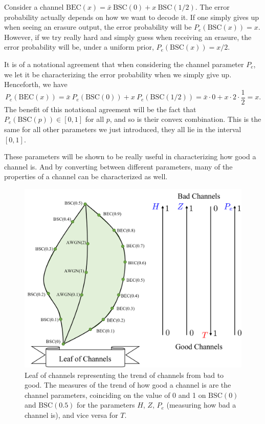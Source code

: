 \begin{example}
    Consider a channel $\mathrm{BEC}(x) = \bar{x}~\mathrm{BSC}(0) + x~\mathrm{BSC}(1/2)$. The error probability actually depends on how we want to decode it. If one simply gives up when seeing an erasure output, the error probability will be $P_e(\mathrm{BSC}(x))=x$. However, if we try really hard and simply guess when receiving an erasure, the error probability will be, under a uniform prior, $P_e(\mathrm{BSC}(x))=x/2$.

    It is of a notational agreement that when considering the channel parameter $P_e$, we let it be characterizing the error probability when we simply give up. Henceforth, we have
    \begin{equation*}
        P_e\left(\mathrm{BEC}(x)\right) = \bar{x}~P_e\left(\mathrm{BSC}(0)\right) + x~P_e\left(\mathrm{BSC}(1/2)\right) = \bar{x}\cdot0 + x\cdot2\cdot\frac{1}{2} = x.
    \end{equation*}
    The benefit of this notational agreement will be the fact that $P_e\left(\mathrm{BSC}(p)\right)\in[0,1]$ for all $p$, and so is their convex combination. This is the same for all other parameters we just introduced, they all lie in the interval $[0,1]$.
\end{example}
These parameters will be shown to be really useful in characterizing how good a channel is. And by converting between different parameters, many of the properties of a channel can be characterized as well.

\begin{figure}[H]
    \centering
    \includegraphics[width=0.8\linewidth]{figures/w5_leaf_of_channels.png}
    \caption{Leaf of channels representing the trend of channels from bad to good. The measures of the trend of how good a channel is are the channel parameters, coinciding on the value of 0 and 1 on $\mathrm{BSC}(0)$ and $\mathrm{BSC}(0.5)$ for the parameters $H$, $Z$, $P_e$ (measuring how bad a channel is), and vice versa for $T$.}
\end{figure}


